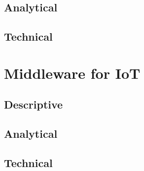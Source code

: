 \subsection{Analytical}
\subsection{Technical}

\section{Middleware for IoT}

\subsection{Descriptive}
\subsection{Analytical}
\subsection{Technical}


